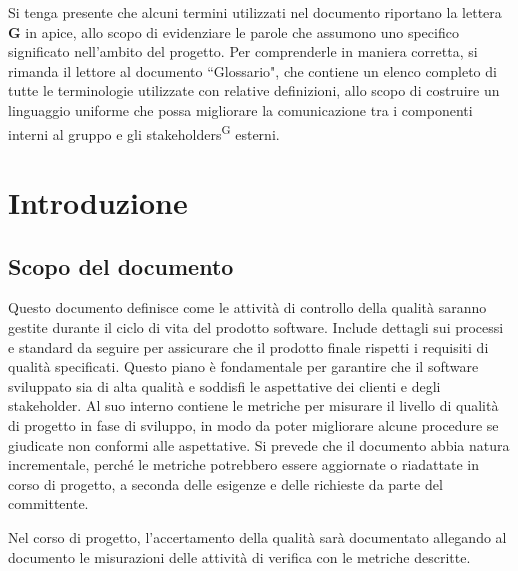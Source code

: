 \begin{beginSngnote}
    Si tenga presente che alcuni termini utilizzati nel documento riportano la lettera \textbf{G} in apice, allo scopo di evidenziare le parole che assumono uno specifico significato nell'ambito del progetto. Per comprenderle in maniera corretta, si rimanda il lettore al documento ``Glossario", che contiene un elenco completo di tutte le terminologie utilizzate con relative definizioni, allo scopo di costruire un linguaggio uniforme che possa migliorare la comunicazione tra i componenti interni al gruppo e gli stakeholders\textsuperscript{G} esterni.   %
\end{beginSngnote}


\section{Introduzione}

\subsection{Scopo del documento}\label{sec:scopo_del_documento}
\par Questo documento definisce come le attività di controllo della qualità saranno gestite durante il ciclo di vita del prodotto software. Include dettagli sui processi e standard da seguire per assicurare che il prodotto finale rispetti i requisiti di qualità specificati. Questo piano è fondamentale per garantire che il software sviluppato sia di alta qualità e soddisfi le aspettative dei clienti e degli stakeholder. Al suo interno contiene le metriche per misurare il livello di qualità di progetto in fase di sviluppo, in modo da poter migliorare alcune procedure se giudicate non conformi alle aspettative. Si prevede che il documento abbia natura incrementale, perché le metriche potrebbero essere aggiornate o riadattate in corso di progetto, a seconda delle esigenze e delle richieste da parte del committente.
\par Nel corso di progetto, l'accertamento della qualità sarà documentato allegando al documento le misurazioni delle attività di verifica con le metriche descritte.

